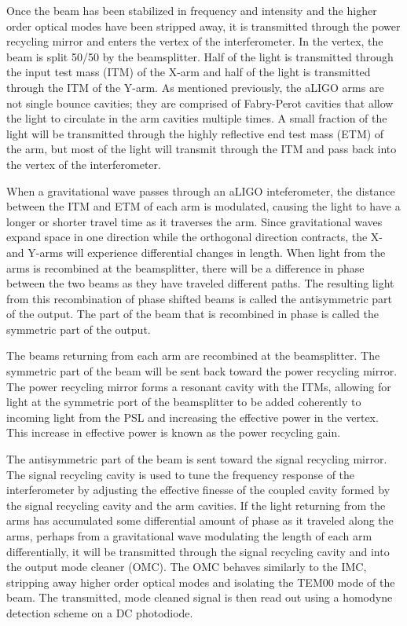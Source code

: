 Once the beam has been stabilized in frequency and intensity and the higher order 
optical modes have been stripped away, it is transmitted through the power 
recycling mirror and enters the vertex of the interferometer. In the vertex, 
the beam is split 50/50 by the beamsplitter. Half of the light is transmitted 
through the input test mass (ITM) of the X-arm and half of the light is transmitted 
through the ITM of the Y-arm. As mentioned previously, the aLIGO arms are not 
single bounce cavities; they are comprised of Fabry-Perot cavities that allow the 
light to circulate in the arm cavities multiple times. A small fraction of the 
light will be transmitted through the highly reflective end test mass (ETM) 
of the arm, but most of the light will transmit through the ITM and pass 
back into the vertex of the interferometer. 

When a gravitational wave passes through an aLIGO inteferometer, the distance
between the ITM and ETM of each arm is modulated, causing the light to have a
longer or shorter travel time as it traverses the arm. Since gravitational
waves expand space in one direction while the orthogonal direction contracts,     
the X- and Y-arms will experience differential changes in length. When light
from the arms is recombined at the beamsplitter, there will be a difference
in phase between the two beams as they have traveled different paths. The 
resulting light from this recombination of phase shifted beams is called the 
antisymmetric part of the output. The part of the beam that is recombined 
in phase is called the symmetric part of the output.

The beams returning from each arm are recombined at the beamsplitter. The 
symmetric part of the beam 
will be sent back toward the power recycling mirror. The power recycling mirror 
forms a resonant cavity with the ITMs, allowing for light at the symmetric 
port of the beamsplitter to be added coherently to incoming light from the PSL and 
increasing the effective power in the vertex. This increase in effective power 
is known as the power recycling gain. 

The antisymmetric part of the beam is sent toward the signal recycling mirror. 
The signal recycling cavity is used to tune the frequency response of the 
interferometer by adjusting the effective finesse of the coupled cavity 
formed by the signal recycling cavity and the arm cavities. 
If the light returning from the arms has accumulated some differential amount of 
phase as it traveled 
along the arms, perhaps from a gravitational wave modulating the length of each 
arm differentially, it will be transmitted through the signal recycling cavity 
and into the output mode cleaner (OMC). The OMC behaves similarly to the IMC, 
stripping away higher order optical modes and isolating the TEM00 mode of the 
beam. The transmitted, mode cleaned signal is then read out using a homodyne 
detection scheme on a DC photodiode. 

